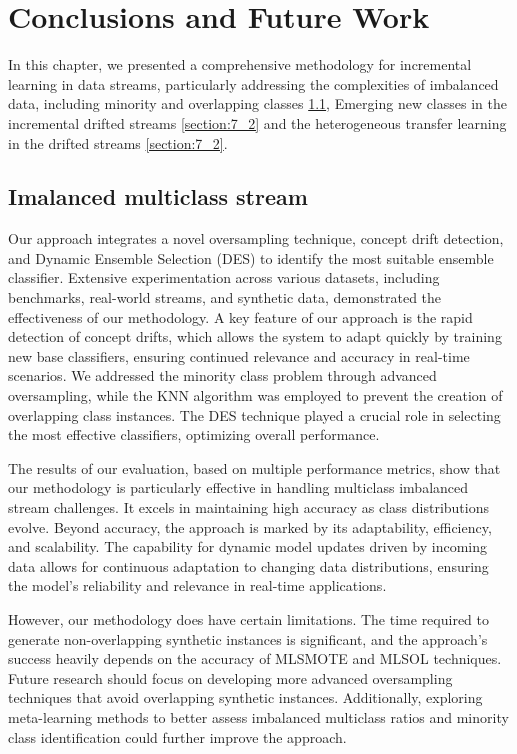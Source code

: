 
\chapter{Conclusions and Future Work}
\label{chapter:7_Conclusions}
In this chapter, we presented a comprehensive methodology for incremental learning in data streams, particularly addressing the complexities of imbalanced data, including minority and overlapping classes \ref{section:7_1}, Emerging new classes in the incremental drifted streams \ref{section:7_2} and the heterogeneous transfer learning in the drifted streams \ref{section:7_2}.

\section{Imalanced multiclass stream}
\label{section:7_1}
Our approach integrates a novel oversampling technique, concept drift detection, and Dynamic Ensemble Selection (DES) to identify the most suitable ensemble classifier. Extensive experimentation across various datasets, including benchmarks, real-world streams, and synthetic data, demonstrated the effectiveness of our methodology.
A key feature of our approach is the rapid detection of concept drifts, which allows the system to adapt quickly by training new base classifiers, ensuring continued relevance and accuracy in real-time scenarios. We addressed the minority class problem through advanced oversampling, while the KNN algorithm was employed to prevent the creation of overlapping class instances. The DES technique played a crucial role in selecting the most effective classifiers, optimizing overall performance.

The results of our evaluation, based on multiple performance metrics, show that our methodology is particularly effective in handling multiclass imbalanced stream challenges. It excels in maintaining high accuracy as class distributions evolve. Beyond accuracy, the approach is marked by its adaptability, efficiency, and scalability. The capability for dynamic model updates driven by incoming data allows for continuous adaptation to changing data distributions, ensuring the model's reliability and relevance in real-time applications.

However, our methodology does have certain limitations. The time required to generate non-overlapping synthetic instances is significant, and the approach's success heavily depends on the accuracy of MLSMOTE and MLSOL techniques. Future research should focus on developing more advanced oversampling techniques that avoid overlapping synthetic instances. Additionally, exploring meta-learning methods to better assess imbalanced multiclass ratios and minority class identification could further improve the approach.

